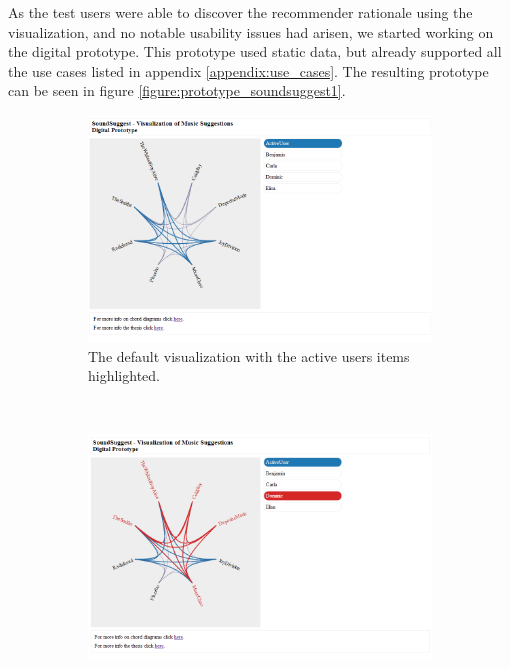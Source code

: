 As the test users were able to discover the recommender rationale using the visualization, and no notable usability issues had arisen, we started working on the digital prototype. This prototype used static data, but already supported all the use cases listed in appendix \ref{appendix:use_cases}. The resulting prototype can be seen in figure \ref{figure:prototype_soundsuggest1}.


\begin{figure}
	\centering
	\begin{subfigure}[t]{0.3\textwidth}
					\centering
					\includegraphics[width=\textwidth]{img/prototype_soundsuggest1_default}
					\caption{The default visualization with the active users items highlighted.}
					\label{figure:prototype_soundsuggest1_default}
	\end{subfigure}%
	~
	\begin{subfigure}[t]{0.3\textwidth}
					\centering
					\includegraphics[width=\textwidth]{img/prototype_soundsuggest1_user_click}

\end{subfigure}
\end{figure}
